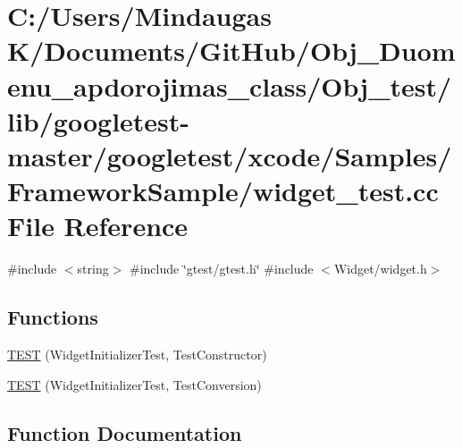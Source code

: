 \hypertarget{_obj__test_2lib_2googletest-master_2googletest_2xcode_2_samples_2_framework_sample_2widget__test_8cc}{}\section{C\+:/\+Users/\+Mindaugas K/\+Documents/\+Git\+Hub/\+Obj\+\_\+\+Duomenu\+\_\+apdorojimas\+\_\+class/\+Obj\+\_\+test/lib/googletest-\/master/googletest/xcode/\+Samples/\+Framework\+Sample/widget\+\_\+test.cc File Reference}
\label{_obj__test_2lib_2googletest-master_2googletest_2xcode_2_samples_2_framework_sample_2widget__test_8cc}
{\ttfamily \#include $<$string$>$}\newline
{\ttfamily \#include \char`\"{}gtest/gtest.\+h\char`\"{}}\newline
{\ttfamily \#include $<$Widget/widget.\+h$>$}\newline
\subsection*{Functions}
\begin{DoxyCompactItemize}
\item 
\mbox{\hyperlink{_obj__test_2lib_2googletest-master_2googletest_2xcode_2_samples_2_framework_sample_2widget__test_8cc_a291536a26f617362e0c4b58941eeaead}{T\+E\+ST}} (Widget\+Initializer\+Test, Test\+Constructor)
\item 
\mbox{\hyperlink{_obj__test_2lib_2googletest-master_2googletest_2xcode_2_samples_2_framework_sample_2widget__test_8cc_ab0b72ae0a336fd2a4470c6b5566cd8c0}{T\+E\+ST}} (Widget\+Initializer\+Test, Test\+Conversion)
\end{DoxyCompactItemize}


\subsection{Function Documentation}
\mbox{\label{_obj__test_2lib_2googletest-master_2googletest_2xcode_2_samples_2_framework_sample_2widget__test_8cc_a291536a26f617362e0c4b58941eeaead}} 
